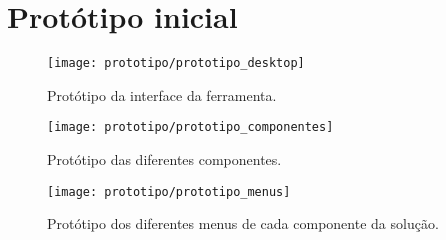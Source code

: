 \chapter{Protótipo inicial}
\label{app:prototipo_inicial}

\begin{figure}[htbp]
  \texttt{[image: prototipo/prototipo\_desktop]}
  \centering
  \caption{Protótipo da interface da ferramenta.}
  \label{fig:prototipo_desktop}
\end{figure}

\begin{figure}[htbp]
  \texttt{[image: prototipo/prototipo\_componentes]}
  \centering
  \caption{Protótipo das diferentes componentes.}
  \label{fig:prototipo_componentes}
\end{figure}

\begin{figure}[htbp]
  \texttt{[image: prototipo/prototipo\_menus]}
  \centering
  \caption{Protótipo dos diferentes menus de cada componente da solução.}
  \label{fig:prototipo_menus}
\end{figure}
